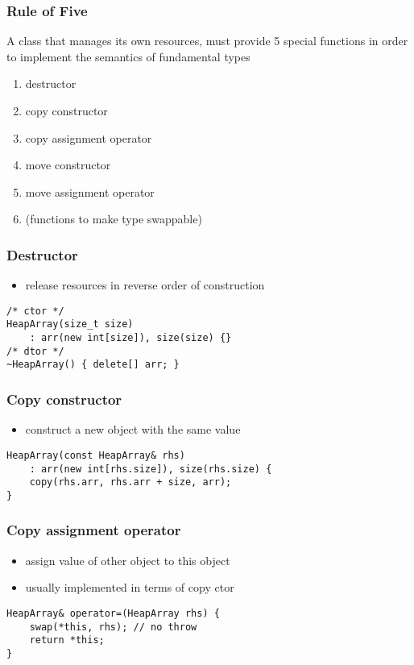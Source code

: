 \begin{frame}[fragile]
    \frametitle{Rule of Five}
    A class that manages its own resources, must provide 5 special functions in order to implement the semantics of fundamental types
    \begin{enumerate}
        \item destructor
        \item copy constructor
        \item copy assignment operator
        \item move constructor
        \item move assignment operator
        \item (functions to make type swappable)
    \end{enumerate}
\end{frame}

\begin{frame}[fragile]
    \frametitle{Destructor}
    \begin{itemize}
        \item release resources in reverse order of construction
    \end{itemize}
    \begin{lstlisting}[numbers=none]
/* ctor */
HeapArray(size_t size)
    : arr(new int[size]), size(size) {}
/* dtor */
~HeapArray() { delete[] arr; }
    \end{lstlisting}
\end{frame}

\begin{frame}[fragile]
    \frametitle{Copy constructor}
    \begin{itemize}
        \item construct a new object with the same value
    \end{itemize}
    \begin{lstlisting}[numbers=none]
HeapArray(const HeapArray& rhs)
    : arr(new int[rhs.size]), size(rhs.size) {
    copy(rhs.arr, rhs.arr + size, arr);
}
    \end{lstlisting}
\end{frame}

\begin{frame}[fragile]
    \frametitle{Copy assignment operator}
    \begin{itemize}
        \item assign value of other object to this object
        \item usually implemented in terms of copy ctor
    \end{itemize}
    \begin{lstlisting}[numbers=none]
HeapArray& operator=(HeapArray rhs) {
    swap(*this, rhs); // no throw
    return *this;
}
    \end{lstlisting}
\end{frame}

